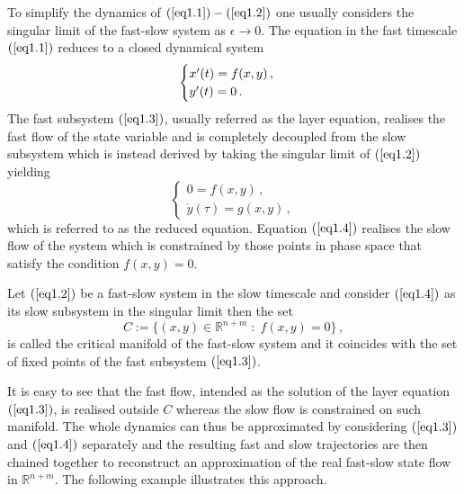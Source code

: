 \documentclass[../main.tex]{subfiles}
\begin{document}
To simplify the dynamics of $(\ref{eq1.1})-(\ref{eq1.2})$ one usually considers the singular limit of the fast-slow system as $\epsilon\to0$. 
The equation in the fast timescale $(\ref{eq1.1})$ reduces to a closed dynamical system 
\begin{equation}\label{eq1.3}
   \begin{cases}
      x'(t) = f(x,y) \,, \\
      y'(t) = 0\,. 
   \end{cases}
\end{equation}
The fast subsystem $(\ref{eq1.3})$, usually referred as the layer equation, realises the fast flow of the state variable and is completely decoupled from the slow subsystem which is instead derived by taking the singular limit of $(\ref{eq1.2})$ yielding 
\begin{equation}\label{eq1.4}
   \begin{cases}
      0 = f(x,y) \,, \\
      \dot{y}(\tau) = g(x,y) \,, 
   \end{cases}
\end{equation}
which is referred to as the reduced equation.
Equation $(\ref{eq1.4})$ realises the slow flow of the system which is constrained by those points in phase space that satisfy the condition $f(x,y)=0$.
\begin{definition}\label{def1.2}
     Let $(\ref{eq1.2})$ be a fast-slow system in the slow timescale and consider $(\ref{eq1.4})$ as its slow subsystem in the singular limit then the set
     \begin{equation}\label{eq1.5}
             C:=\{(x,y)\in \mathbb{R}^{n+m}\;:\;f(x,y)=0\}\,,
     \end{equation}
     is called the critical manifold of the fast-slow system and it coincides with the set of fixed points of the fast subsystem $(\ref{eq1.3})$.
\end{definition}
It is easy to see that the fast flow, intended as the solution of the layer equation $(\ref{eq1.3})$, is realised outside $C$ whereas the slow flow is constrained on such manifold.
The whole dynamics can thus be approximated by considering $(\ref{eq1.3})$ and $(\ref{eq1.4})$ separately and the resulting fast and slow trajectories are then chained together to reconstruct an approximation of the real fast-slow state flow in $\mathbb{R}^{n+m}$. The following example illustrates this approach. 
\end{document}
